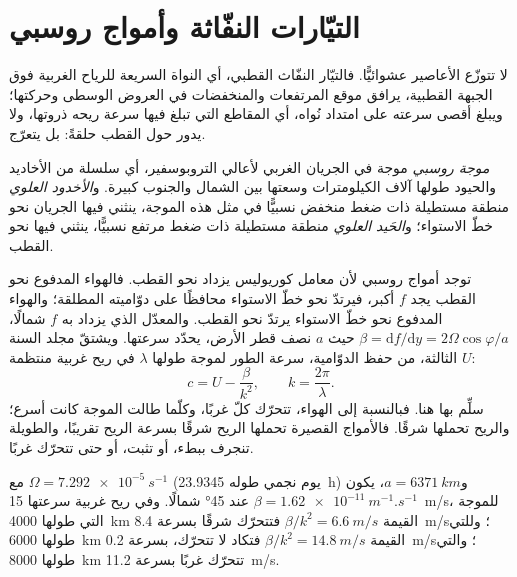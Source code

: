 \section{التيّارات النفّاثة وأمواج روسبي}\label{sec:b2:weather-systems:rossby}

لا تتوزّع الأعاصير عشوائيًّا. فالتيّار النفّاث القطبي، أي النواة السريعة للرياح الغربية فوق
الجبهة القطبية، يرافق موقع المرتفعات والمنخفضات في العروض الوسطى وحركتها؛
ويبلغ أقصى سرعته على امتداد نُواه، أي المقاطع التي تبلغ فيها سرعة ريحه ذروتها،
ولا يدور حول القطب حلقةً: بل يتعرّج.

\begin{definition}\label{def:b2:weather-systems:rossby}
\emph{موجة روسبي} موجة في الجريان الغربي لأعالي التروبوسفير،
أي سلسلة من الأخاديد والحيود طولها آلاف الكيلومترات وسعتها بين الشمال والجنوب كبيرة.
و\emph{الأخدود العلوي} منطقة مستطيلة ذات ضغط منخفض نسبيًّا
في مثل هذه الموجة، ينثني فيها الجريان نحو خطّ الاستواء؛ و\emph{الحَيد
العلوي} منطقة مستطيلة ذات ضغط مرتفع نسبيًّا، ينثني فيها
نحو القطب.
\end{definition}

توجد أمواج روسبي لأن معامل كوريوليس يزداد نحو القطب. فالهواء المدفوع نحو القطب
يجد $f$ أكبر، فيرتدّ نحو خطّ الاستواء محافظًا على دوّاميته المطلقة؛ والهواء
المدفوع نحو خطّ الاستواء يرتدّ نحو القطب. والمعدّل الذي يزداد به $f$ شمالًا،
$\beta = \mathrm{d}f/\mathrm{d}y = 2\Omega\cos\varphi/a$ حيث $a$ نصف قطر الأرض، يحدّد
سرعتها. ويشتقّ مجلد السنة الثالثة، من حفظ الدوّامية، سرعة الطور لموجة
طولها $\lambda$ في ريح غربية منتظمة $U$:
\[
  c = U - \frac{\beta}{k^2}, \qquad k = \frac{2\pi}{\lambda} .
\]
سلِّم بها هنا. فبالنسبة إلى الهواء، تتحرّك كلّ  غربًا، وكلّما طالت الموجة كانت
أسرع؛ والريح تحملها شرقًا. فالأمواج القصيرة تحملها الريح شرقًا بسرعة الريح تقريبًا،
والطويلة تنجرف ببطء، أو تثبت، أو حتى تتحرّك غربًا.

\begin{example}\label{ex:b2:weather-systems:rossby}
مع $\Omega = \qty{7.292e-5}{s^{-1}}$ (يوم نجمي طوله \qty{23.9345}{h}) و$a =
\qty{6371}{km}$، يكون $\beta = \qty{1.62e-11}{m^{-1}.s^{-1}}$ عند \ang{45} شمالًا. وفي ريح غربية سرعتها
\qty{15}{m/s}، للموجة التي طولها \qty{4000}{km} القيمة $\beta/k^2 = \qty{6.6}{m/s}$ فتتحرّك شرقًا بسرعة
\qty{8.4}{m/s}؛ وللتي طولها \qty{6000}{km} القيمة $\beta/k^2 = \qty{14.8}{m/s}$ فتكاد لا تتحرّك، بسرعة
\qty{0.2}{m/s}؛ والتي طولها \qty{8000}{km} تتحرّك غربًا بسرعة \qty{11.2}{m/s}.
\end{example}

